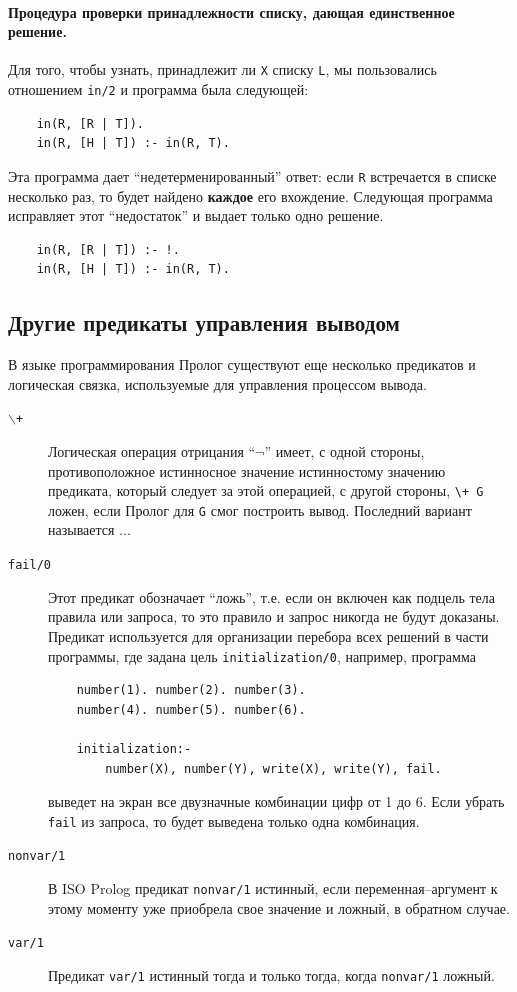 \documentclass[12pt, openany, twoside]{book} %
\begin{document}
\paragraph{Процедура проверки принадлежности списку, дающая единственное
решение.} Для того, чтобы узнать, принадлежит ли {\tt X} списку {\tt L}, мы пользовались отношением {\tt in/2} и программа была следующей:
{\tt \begin{verbatim}
    in(R, [R | Т]).
    in(R, [H | Т]) :- in(R, T).
\end{verbatim}}

\noindent Эта программа дает ``недетерменированный'' ответ: если {\tt R} встречается в списке несколько раз, то будет найдено {\bf каждое} его вхождение. Следующая программа исправляет этот ``недостаток'' и выдает только одно решение.
{\tt \begin{verbatim}
    in(R, [R | Т]) :- !.
    in(R, [H | Т]) :- in(R, T).
\end{verbatim}}

\subsection{Другие предикаты управления выводом}

В языке программирования Пролог существуют еще несколько предикатов и логическая связка, используемые для управления процессом вывода.

\begin{description}
\item[{\tt $\backslash$+}] Логическая операция отрицания ``$\neg$'' имеет, с одной стороны, противоположное истинносное значение истинностому значению пре\-ди\-ка\-та, который следует за этой операцией, с другой стороны, {\tt \verb|\+| G} ложен, если Пролог для  {\tt G} смог построить вывод. Последний вариант называется ... %
\item[\tt fail/0] Этот предикат обозначает ``ложь'', т.е. если он включен как подцель тела правила или запроса, то это правило и запрос никогда не будут доказаны. Предикат используется для организации перебора всех решений в части программы, где задана цель \texttt{initialization/0}, например, программа
{\tt \begin{verbatim}
    number(1). number(2). number(3).
    number(4). number(5). number(6).

    initialization:-
        number(X), number(Y), write(X), write(Y), fail.
\end{verbatim}}
выведет на экран все двузначные комбинации цифр от 1 до 6. Если убрать {\tt fail} из запроса, то будет выведена только одна комбинация.
\item[\tt nonvar/1] В ISO Prolog предикат {\tt nonvar/1} истинный, если пе\-ре\-мен\-ная--аргумент к этому моменту уже приобрела свое значение и ложный, в обратном случае.
\item[\tt var/1] Предикат {\tt var/1} истинный тогда и только тогда, когда {\tt nonvar/1} ложный.
\end{description}
\end{document}
